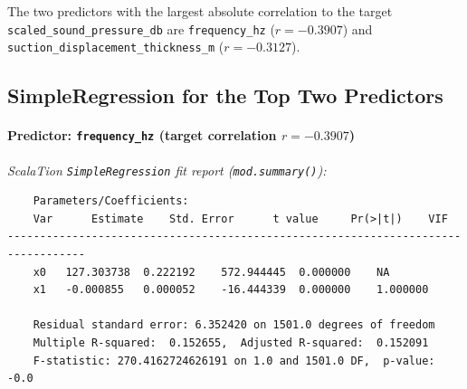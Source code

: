 The two predictors with the largest absolute correlation to the target \texttt{scaled\_sound\_pressure\_db} are \texttt{frequency\_hz} ($r=-0.3907$) and \texttt{suction\_displacement\_thickness\_m} ($r=-0.3127$).

\subsection{SimpleRegression for the Top Two Predictors}

\paragraph{Predictor: \texttt{frequency\_hz} (target correlation $r = -0.3907$)}

\textit{ScalaTion \texttt{SimpleRegression} fit report (\texttt{mod.summary()}):}
\begin{verbatim}
    Parameters/Coefficients:
    Var      Estimate    Std. Error 	 t value 	 Pr(>|t|) 	 VIF
----------------------------------------------------------------------------------
    x0	 127.303738	 0.222192	 572.944445	 0.000000	 NA
    x1	 -0.000855	 0.000052	 -16.444339	 0.000000	 1.000000

    Residual standard error: 6.352420 on 1501.0 degrees of freedom
    Multiple R-squared:  0.152655,	Adjusted R-squared:  0.152091
    F-statistic: 270.4162724626191 on 1.0 and 1501.0 DF,  p-value: -0.0
\end{verbatim}

